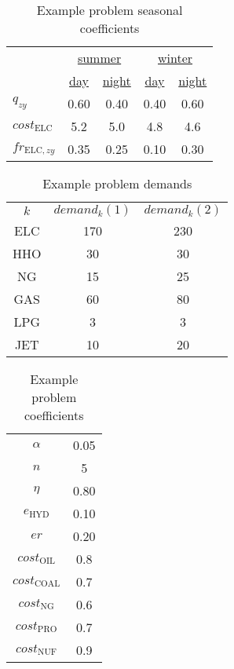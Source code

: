 \begin{table}[ht]
\caption{Example problem seasonal coefficients}
\label{ENV:egseason}
\begin{center}
\begin{tabular}{lcccc}
& \multicolumn{2}{c}{\underline{\hspace{3mm}summer\hspace{3mm}}} & \multicolumn{2}{c}{\underline{\hspace{3mm}winter\hspace{3mm}}}\\
& \underline{day} & \underline{night} & \underline{day} & \underline{night}\\
$q_{zy}$ & 0.60 & 0.40 & 0.40 & 0.60\\
$cost_{\text{ELC}}$ & 5.2 & 5.0 & 4.8 & 4.6\\
$fr_{\text{ELC},zy}$ & 0.35 & 0.25 & 0.10 & 0.30
\end{tabular}
\end{center}
\end{table}

\begin{table}[ht]
\caption{Example problem demands}
\label{ENV:egdemands}
\begin{center}
\begin{tabular}{ccc}
\underline{$k$} & \underline{$demand_k(1)$} & \underline{$demand_k(2)$}\\
ELC & 170 & 230\\
HHO & 30  & 30\\
NG  & 15  & 25\\
GAS & 60  & 80\\
LPG & 3   & 3\\
JET & 10  & 20
\end{tabular}
\end{center}
\end{table}

\begin{table}[ht]
\caption{Example problem coefficients}
\label{ENV:eggeneral}
\begin{center}
\begin{tabular}{cc}
$\alpha$ & 0.05\\
$n$ & 5\\
$\eta$ & 0.80\\
$e_{\text{HYD}}$ & 0.10\\
$er$ & 0.20\\
$cost_{\text{OIL}}$ & 0.8\\
$cost_{\text{COAL}}$ & 0.7\\
$cost_{\text{NG}}$ & 0.6\\
$cost_{\text{PRO}}$ & 0.7\\
$cost_{\text{NUF}}$ & 0.9
\end{tabular}
\end{center}
\end{table}

